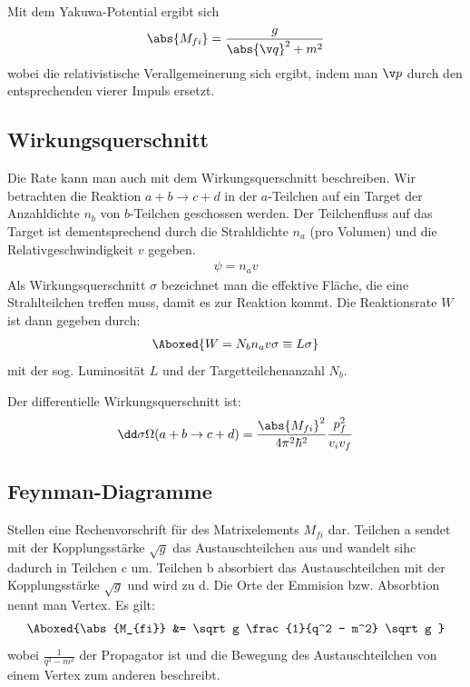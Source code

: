 \documentclass[final]{summery_5.0}
\begin{document}
Mit dem Yakuwa-Potential ergibt sich 
\begin{align*}
    \abs{M_{fi}} = \frac g{\abs{\v q}^2 + m^2}
\end{align*}
wobei die relativistische Verallgemeinerung sich ergibt, indem man $\v p$ durch den entsprechenden vierer Impuls ersetzt. 

\subsection{Wirkungsquerschnitt}
Die Rate kann man auch mit dem Wirkungsquerschnitt beschreiben. Wir betrachten die Reaktion $a+b\to c+d$ in der $a$-Teilchen auf ein Target der Anzahldichte $n_b$ von $b$-Teilchen geschossen werden. Der Teilchenfluss auf das Target ist dementsprechend durch die Strahldichte $n_a$ (pro Volumen) und die Relativgeschwindigkeit $v$ gegeben. 
\begin{align*}
    \psi = n_a v
\end{align*}
Als Wirkungsquerschnitt $\sigma$ bezeichnet man die effektive Fläche, die eine Strahlteilchen treffen muss, damit es zur Reaktion kommt. Die Reaktionsrate $W$ ist dann gegeben durch: 
\begin{align*}
    \Aboxed{W = N_b n_a v\sigma \equiv L \sigma }
\end{align*}
mit der sog. Luminosität $L$ und der Targetteilchenanzahl $N_b$.

Der differentielle Wirkungsquerschnitt ist:
\begin{align*}
    \dd \sigma \Omega(a+b\to c+d) = \frac{\abs{M_{fi}}^2}{4\pi^2\hbar^2} \frac{p_f^2}{v_i v_f}
\end{align*}

\subsection{Feynman-Diagramme}
Stellen eine Rechenvorschrift für des Matrixelements $M_{fi}$ dar. 
Teilchen a sendet mit der Kopplungsstärke $\sqrt g$ das Austauschteilchen aus und wandelt sihc dadurch in Teilchen c um. 
Teilchen b absorbiert das Austauschteilchen mit der Kopplungsstärke $\sqrt g$ und wird zu d. Die Orte der Emmision bzw. Absorbtion nennt man Vertex. Es gilt:
\begin{align*}
    \Aboxed{\abs{M_{fi}} &= \sqrt g \frac{1}{q^2 - m^2} \sqrt g }
\end{align*}
wobei $\frac1{q^2 - m^2}$ der Propagator ist und die Bewegung des Austauschteilchen von einem Vertex zum anderen beschreibt.
\end{document}
